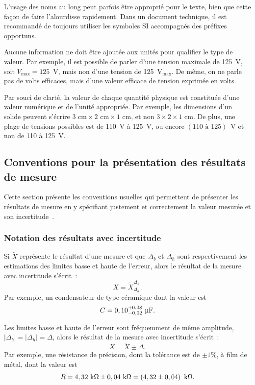 L'usage des noms au long peut parfois être approprié pour le texte, bien que cette façon de faire l'alourdisse rapidement. Dans un document technique, il est recommandé de toujours utiliser les symboles SI accompagnés des préfixes opportuns.

Aucune information ne doit être ajoutée aux unités pour qualifier le type de valeur. Par exemple, il est possible de parler d'une tension maximale de 125~V, soit $V_\text{max} = 125$~V, mais non d'une tension de 125~$\text{V}_\text{max}$. De même, on ne parle pas de volts efficaces, mais d'une valeur efficace de tension exprimée en volts.

Par souci de clarté, la valeur de chaque quantité physique est constituée d'une valeur numérique et de l'unité appropriée. Par exemple, les dimensions d'un solide peuvent s'écrire $3 \text{~cm} \times 2 \text{~cm} \times 1 \text{~cm}$, et non $3 \times 2 \times 1 \text{~cm}$. De plus, une plage de tensions possibles est de 110~V à 125~V, ou encore $(110 \text{~à~} 125)$~V et non de 110 à 125~V.


\subsection{Conventions pour la présentation des résultats de mesure}

Cette section présente les conventions usuelles qui permettent de présenter les résultats de mesure en y spécifiant justement et correctement la valeur mesurée et son incertitude~\cite[App.~A]{KLA96}.


\subsubsection{Notation des résultats avec incertitude}

Si $\tilde{X}$ représente le résultat d'une mesure et que $\Delta_b$ et $\Delta_h$ sont respectivement les estimations des limites basse et haute de l'erreur, alors le résultat de la mesure avec incertitude s'écrit~:
\begin{equation}
  X = \tilde{X}_{\Delta_b}^{\Delta_h}.
\end{equation}
Par exemple, un condensateur de type céramique dont la valeur est
\begin{equation}
  C = 0,10_{-0,02}^{+0,08} \text{~\textmu F}.
\end{equation}

Les limites basse et haute de l'erreur sont fréquemment de même amplitude, $|\Delta_b| = |\Delta_h| = \Delta$, alors le résultat de la mesure avec incertitude s'écrit~:
\begin{equation}
  X = \tilde{X} \pm \Delta.
\end{equation}
Par exemple, une résistance de précision, dont la tolérance est de $\pm 1\%$, à film de métal, dont la valeur est
\begin{equation}
  R = 4,32 \text{~k\textohm} \pm 0,04 \text{~k\textohm} = \left( 4,32 \pm 0,04 \right) \text{~k\textohm}.
\end{equation}



